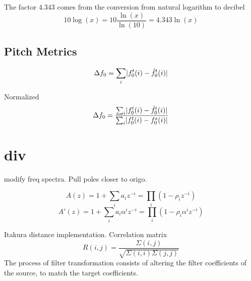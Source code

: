 The factor $4.343$ comes from the conversion from natural logarithm to decibel
\begin{equation}
	10\log(x) = 10 \frac{\ln(x)}{\ln(10)} = 4.343\ln(x) 
\end{equation}

\subsection{Pitch Metrics} %
\label{sub:pitch_metrics}
\begin{equation}
	\Delta f_0 = \sum_{i} \lvert f^t_0 (i)-\hat{f}^t_0 (i)\rvert
\end{equation}

Normalized
\begin{equation}
	\Delta f_0 = \frac{\sum_{i} \lvert f^t_0 (i)-\hat{f}^t_0 (i)\rvert}{\sum_{i} \lvert f^t_0 (i)-f^s_0 (i)\rvert}
\end{equation}



\section{div} %
\label{sec:div}
modify freq spectra. Pull poles closer to origo.

\begin{equation}
	A(z) = 1+ \sum_{i} a_i z^{-i} = \prod_i (1-\rho_i z^{-i})
\end{equation}
\begin{equation}
	A'(z) = 1+ \sum_{i} a_i \alpha^i z^{-i} = \prod_i (1-\rho_i \alpha^i z^{-i})
\end{equation}




Itakura distance implementation. Correlation matrix
\begin{equation}
	R(i,j) = \frac{\Sigma(i,j)}{\sqrt{\Sigma(i,i)\Sigma(j,j)}}
\end{equation}
The process of filter transformation consists of altering the filter coefficients of the source, to match the target coefficients. 



